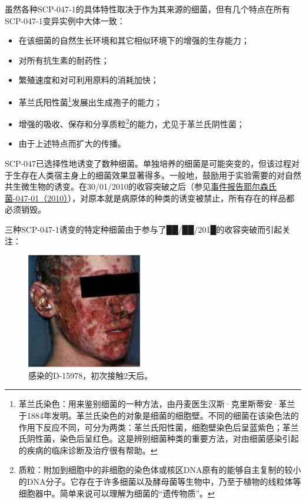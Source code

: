 虽然各种SCP-047-1的具体特性取决于作为其来源的细菌，但有几个特点在所有SCP-047-1变异实例中大体一致：

\begin{itemize}
\item 在该细菌的自然生长环境和其它相似环境下的增强的生存能力；
\item 对所有抗生素的耐药性；
\item 繁殖速度和对可利用原料的消耗加快；
\item 革兰氏阳性菌\footnote{革兰氏染色：用来鉴别细菌的一种方法，由丹麦医生汉斯·克里斯蒂安·革兰于1884年发明。革兰氏染色的对象是细菌的细胞壁。不同的细菌在该染色法的作用下反应不同，可分为两类：革兰氏阳性菌，细胞壁染色后呈蓝紫色；革兰氏阴性菌，染色后呈红色。这是辨别细菌种类的重要方法，对由细菌感染引起的疾病的临床诊断及治疗很有帮助。}发展出生成孢子的能力；
\item 增强的吸收、保存和分享质粒\footnote{质粒：附加到细胞中的非细胞的染色体或核区DNA原有的能够自主复制的较小的DNA分子。它存在于许多细菌以及酵母菌等生物中，乃至于植物的线粒体等细胞器中。简单来说可以理解为细菌的“遗传物质”。}的能力，尤见于革兰氏阴性菌；
\item 由于上述特点而扩大的传播。
\end{itemize}

SCP-047已选择性地诱变了数种细菌。单独培养的细菌是可能突变的，但该过程对于生存在人类宿主身上的细菌效果显著得多。一般地，鼓励用于实验需要的对自然共生微生物的诱变。在30\slash 01\slash 2010的收容突破之后（参见\hyperref[chap:]{事件报告耶尔森氏菌-047-01（2010）}），对原本就是病原体的种类的诱变被禁止，所有存在的样品都必须销毁。

三种SCP-047-1诱变的特定种细菌由于参与了██\slash ██\slash 201█的收容突破而引起关注：



\begin{figure}[H]
    \centering
    \includegraphics[width=0.5\linewidth]{images/SCP.047.2.jpg}
    \caption*{感染的D-15978，初次接触2天后。}
\end{figure}

